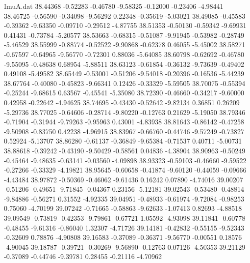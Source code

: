 \begin{filecontents}{ImuA.dat}
  38.44368   -0.52283   -0.46780   -9.58325   -0.12000   -0.23406   -4.98441
  38.46725   -0.56590   -0.34098   -9.56292    0.22348   -0.35619   -5.03021
  38.49085   -0.45583   -0.39362   -9.63350   -0.09710   -0.29512   -4.87755
  38.51353   -0.50130   -0.59342   -9.69931    0.41431   -0.73784   -5.20577
  38.53663   -0.68315   -0.51087   -9.91945   -0.53982   -0.28749   -5.46529
  38.55999   -0.88774   -0.52522   -9.90868   -0.62378    0.46055   -5.45002
  38.58271   -0.67597   -0.64965   -9.56770   -0.72301    0.88036   -5.64085
  38.60798   -0.62692   -0.46780   -9.55095   -0.48638    0.68954   -5.88511
  38.63123   -0.61854   -0.36132   -9.73639   -0.49402    0.49108   -5.49582
  38.65449   -0.53001   -0.51206   -9.54018   -0.20396   -0.16536   -5.44239
  38.67764   -0.40080   -0.45823   -9.66341    0.12426   -0.33329   -5.59505
  38.70075   -0.55394   -0.25244   -9.68615    0.63567   -0.45541   -5.35080
  38.72390   -0.46660   -0.34217   -9.60000    0.42958   -0.22642   -4.94625
  38.74695   -0.43430   -0.52642   -9.82134    0.36851    0.26209   -5.29736
  38.77025   -0.64606   -0.28714   -9.80220   -0.12763    0.21629   -5.19050
  38.79346   -0.71904   -0.31944   -9.79263   -0.95963    0.43001   -4.83938
  38.81643   -0.86142   -0.47258   -9.50908   -0.83750    0.42238   -4.96915
  38.83967   -0.66760   -0.44746   -9.57249   -0.73827    0.52924   -5.13707
  38.86280   -0.61137   -0.36849   -9.65384   -0.71537    0.40711   -5.00731
  38.88618   -0.39242   -0.43190   -9.50429   -0.58561    0.04836   -4.38904
  38.90963   -0.50249   -0.45464   -9.48635   -0.63141   -0.03560   -4.09898
  38.93323   -0.59103   -0.46660   -9.59522   -0.27266   -0.33329   -4.19821
  38.95645   -0.60658   -0.41874   -9.60120   -0.44059   -0.09666   -4.43484
  38.97872   -0.50369   -0.46062   -9.61436    0.16242    0.07890   -4.74016
  39.00207   -0.51206   -0.49651   -9.71845   -0.04367    0.23156   -5.12181
  39.02543   -0.53480   -0.48814   -9.84886   -0.56271    0.31552   -4.92335
  39.04951   -0.48933   -0.61974   -9.72084   -0.98253    0.75060   -4.70199
  39.07242   -0.71665   -0.58863   -9.62633   -1.07413    0.82693   -4.88518
  39.09549   -0.73819   -0.42353   -9.79861   -0.67721    1.05592   -4.93098
  39.11841   -0.60778   -0.48455   -9.61316   -0.86040    1.32307   -4.71726
  39.14181   -0.42832   -0.55155   -9.52343   -0.32609    0.78876   -4.90808
  39.16583   -0.37089   -0.36371   -9.56770   -0.00551    0.18576   -4.90045
  39.18787   -0.39721   -0.30269   -9.56890   -0.12763    0.07126   -4.50353
  39.21129   -0.37089   -0.44746   -9.39781    0.28455   -0.21116   -4.70962

\end{filecontents}
